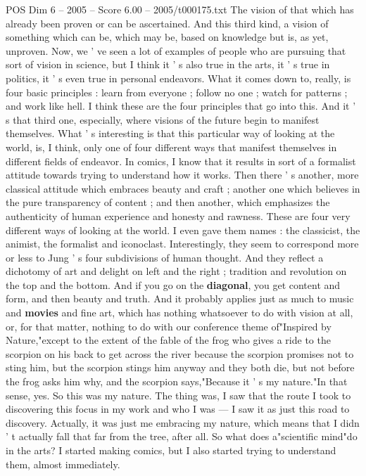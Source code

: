 \begin{textsample}{POS Dim 6 – 2005 – Score 6.00 – 2005/t000175.txt}
The vision of that which has already been proven or can be ascertained.
And this third kind, a vision of something which can be, which may be, based on knowledge but is, as yet, unproven.
Now, we ' ve seen a lot of examples of people who are pursuing that sort of vision in science, but I think it ' s also true in the arts, it ' s true in politics, it ' s even true in personal endeavors.
What it comes down to, really, is four basic principles : learn from everyone ; follow no one ; watch for patterns ; and work like hell.
I think these are the four principles that go into this.
And it ' s that third one, especially, where visions of the future begin to manifest themselves.
What ' s interesting is that this particular way of looking at the world, is, I think, only one of four different ways that manifest themselves in different fields of endeavor.
In comics, I know that it results in sort of a formalist attitude towards trying to understand how it works.
Then there ' s another, more classical attitude which embraces beauty and craft ; another one which believes in the pure transparency of content ; and then another, which emphasizes the authenticity of human experience and honesty and rawness.
These are four very different ways of looking at the world.
I even gave them names : the classicist, the animist, the formalist and iconoclast.
Interestingly, they seem to correspond more or less to Jung ' s four subdivisions of human thought.
And they reflect a dichotomy of art and delight on left and the right ; tradition and revolution on the top and the bottom.
And if you go on the \textbf{diagonal}, you get content and form, and then beauty and truth.
And it probably applies just as much to music and \textbf{movies} and fine art, which has nothing whatsoever to do with vision at all, or, for that matter, nothing to do with our conference theme of"Inspired by Nature,"except to the extent of the fable of the frog who gives a ride to the scorpion on his back to get across the river because the scorpion promises not to sting him, but the scorpion stings him anyway and they both die, but not before the frog asks him why, and the scorpion says,"Because it ' s my nature."In that sense, yes.
So this was my nature.
The thing was, I saw that the route I took to discovering this focus in my work and who I was — I saw it as just this road to discovery.
Actually, it was just me embracing my nature, which means that I didn ' t actually fall that far from the tree, after all.
So what does a"scientific mind"do in the arts?
I started making comics, but I also started trying to understand them, almost immediately.

\end{textsample}
